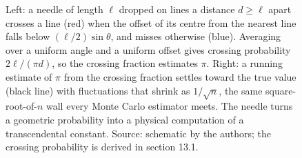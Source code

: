 \begin{figure}[htbp]
\begin{tikzpicture}[font=\small]
\end{tikzpicture}
\caption[Buffon's needle and its Monte Carlo estimate of $\pi$]{Left: a
needle of length $\ell$ dropped on lines a distance $d\ge\ell$ apart
crosses a line (red) when the offset of its centre from the nearest line
falls below $(\ell/2)\sin\theta$, and misses otherwise (blue). Averaging
over a uniform angle and a uniform offset gives crossing probability
$2\ell/(\pi d)$, so the crossing fraction estimates $\pi$. Right: a
running estimate of $\pi$ from the crossing fraction settles toward the
true value (black line) with fluctuations that shrink as $1/\sqrt{n}$,
the same square-root-of-$n$ wall every Monte Carlo estimator meets. The
needle turns a geometric probability into a physical computation of a
transcendental constant. Source: schematic by the authors; the crossing
probability is derived in section 13.1.}
\label{fig:vol02ch13:buffon-needle}
\end{figure}
